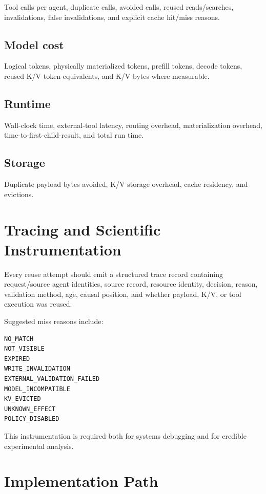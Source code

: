 \documentclass[11pt]{article}
\begin{document}
Tool calls per agent, duplicate calls, avoided calls, reused reads/searches, invalidations, false invalidations, and explicit cache hit/miss reasons.

\subsection{Model cost}

Logical tokens, physically materialized tokens, prefill tokens, decode tokens, reused K/V token-equivalents, and K/V bytes where measurable.

\subsection{Runtime}

Wall-clock time, external-tool latency, routing overhead, materialization overhead, time-to-first-child-result, and total run time.

\subsection{Storage}

Duplicate payload bytes avoided, K/V storage overhead, cache residency, and evictions.

\section{Tracing and Scientific Instrumentation}

Every reuse attempt should emit a structured trace record containing request/source agent identities, source record, resource identity, decision, reason, validation method, age, causal position, and whether payload, K/V, or tool execution was reused.

Suggested miss reasons include:

\begin{lstlisting}[basicstyle=\ttfamily\small]
NO_MATCH
NOT_VISIBLE
EXPIRED
WRITE_INVALIDATION
EXTERNAL_VALIDATION_FAILED
MODEL_INCOMPATIBLE
KV_EVICTED
UNKNOWN_EFFECT
POLICY_DISABLED
\end{lstlisting}

This instrumentation is required both for systems debugging and for credible experimental analysis.

\section{Implementation Path}
\end{document}
